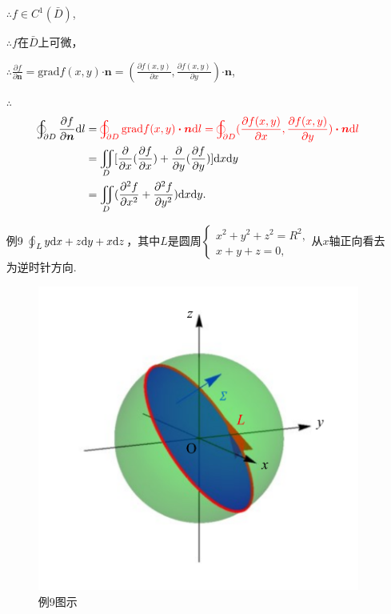 \documentclass[12pt,UTF8,fleqn]{ctexart}
\newcommand{\varIInt}[4]{\iint\limits_{#1}#2\mathrm d#3\mathrm d#4}
\newcommand{\LOInt}[3]{\varoint\nolimits_{#1}#2\mathrm d#3}
\newcommand{\BLOInt}[2]{\varoint\nolimits_{#1}#2}
\newcommand{\md}[1]{\mathrm d#1}
\begin{document}
\begin{enumerate}
$\therefore f\in C^1(\bar{D})$,

$\therefore f$在$\bar{D}$上可微，

$\therefore\frac{\partial f}{\partial\bm n}=\text{grad}f(x,y)\bm\cdot\bm n=(\frac{\partial f(x,y)}{\partial x},\frac{\partial f(x,y)}{\partial y})\bm\cdot\bm n$,

$\therefore$
\[\begin{split}
\LOInt{\partial D}{\frac{\partial f}{\partial\bm n}}l&=\color{red}\LOInt{\partial D}{\text{grad}f(x,y)\bm\cdot\bm n}{l}=\LOInt{\partial D}{(\frac{\partial f(x,y)}{\partial x},\frac{\partial f(x,y)}{\partial y})\bm\cdot\bm n}{l}\\
&=\varIInt{D}{[\frac\partial{\partial x}(\frac{\partial f}{\partial x})+\frac\partial{\partial y}(\frac{\partial f}{\partial y})]}{x}{y}\\
&=\varIInt D{(\frac{\partial^2f}{\partial x^2}+\frac{\partial^2f}{\partial y^2})}xy.
\end{split}\]
\item[例9]$\BLOInt L{y\md x+z\md y+x\md z}$，其中$L$是圆周$\begin{cases}
x^2+y^2+z^2=R^2,\\
x+y+z=0,
\end{cases}$从$x$轴正向看去为逆时针方向.

\begin{figure}[H]
\begin{center}
\includegraphics[height=0.5\textheight]{Figures24/Fig13-5-2-1.pdf}
\end{center}
\caption{例9图示}
\label{13-5-2-1}
\end{figure}


\end{enumerate}
\end{document}
